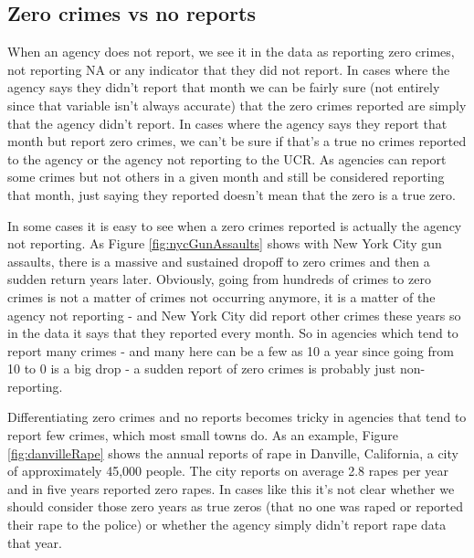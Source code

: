 \documentclass[
  12pt,
  openany]{book}
\begin{document}
\hypertarget{zero-crimes-vs-no-reports}{%
\subsection{Zero crimes vs no reports}\label{zero-crimes-vs-no-reports}}

When an agency does not report, we see it in the data as reporting zero crimes, not reporting NA or any indicator that they did not report. In cases where the agency says they didn't report that month we can be fairly sure (not entirely since that variable isn't always accurate) that the zero crimes reported are simply that the agency didn't report. In cases where the agency says they report that month but report zero crimes, we can't be sure if that's a true no crimes reported to the agency or the agency not reporting to the UCR. As agencies can report some crimes but not others in a given month and still be considered reporting that month, just saying they reported doesn't mean that the zero is a true zero.

In some cases it is easy to see when a zero crimes reported is actually the agency not reporting. As Figure \ref{fig:nycGunAssaults} shows with New York City gun assaults, there is a massive and sustained dropoff to zero crimes and then a sudden return years later. Obviously, going from hundreds of crimes to zero crimes is not a matter of crimes not occurring anymore, it is a matter of the agency not reporting - and New York City did report other crimes these years so in the data it says that they reported every month. So in agencies which tend to report many crimes - and many here can be a few as 10 a year since going from 10 to 0 is a big drop - a sudden report of zero crimes is probably just non-reporting.

Differentiating zero crimes and no reports becomes tricky in agencies that tend to report few crimes, which most small towns do. As an example, Figure \ref{fig:danvilleRape} shows the annual reports of rape in Danville, California, a city of approximately 45,000 people. The city reports on average 2.8 rapes per year and in five years reported zero rapes. In cases like this it's not clear whether we should consider those zero years as true zeros (that no one was raped or reported their rape to the police) or whether the agency simply didn't report rape data that year.
\end{document}
